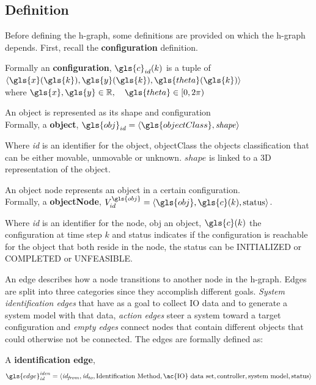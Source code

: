 \subsection{Definition}%
\label{subsec:h-graph_definition}%
Before defining the \ac{h-graph}, some definitions are provided on which the \ac{h-graph} depends. First, recall the \textbf{configuration} definition.\bs

Formally an \textbf{configuration}, $\gls{c}_{id}(k)$ is a tuple of $\left\langle \gls{x}(\gls{k}), \gls{y}(\gls{k}), \gls{theta}(\gls{k})\right\rangle$\\ where $\gls{x}, \gls{y} \in \mathbb{R}, \quad  \gls{theta} \in [0, 2\pi)$\bs

An object is represented as its shape and configuration\\Formally, a \textbf{object},  $\gls{obj}_{id} = \left\langle \gls{objectClass}, \mathit{shape} \right\rangle $\bs

Where \textit{id} is an identifier for the object, \gls{objectClass} the objects classification that can be either movable, unmovable or unknown. $\mathit{shape}$ is linked to a 3D representation of the object.\bs

An object node represents an object in a certain configuration.\\Formally, a \textbf{objectNode}, $V^{\gls{obj}}_{id} =\left\langle \gls{obj}, \gls{c}(k), \textrm{status} \right\rangle $.\bs

Where \textit{id} is an identifier for the node, \gls{obj} an object, $\gls{c}(k)$ the configuration at time step $k$ and status indicates if the configuration is reachable for the object that both reside in the node, the status can be INITIALIZED or COMPLETED or UNFEASIBLE.\bs

An edge describes how a node transitions to another node in the \ac{h-graph}. Edges are split into three categories since they accomplish different goals. \textit{System identification edges} that have as a goal to collect \ac{IO} data and to generate a system model with that data, \textit{action edges} steer a system toward a target configuration and \textit{empty edges} connect nodes that contain different objects that could otherwise not be connected. The edges are formally defined as:\bs

A \textbf{identification edge}, \[\gls{edge}^\mathit{iden}_\mathit{id} = \left\langle \mathit{id_{from}}, \mathit{id_{to}}, \textrm{Identification Method}, \textrm{\ac{IO} data set}, \textrm{controller}, \textrm{system model}, \textrm{status} \right\rangle\]\bs

